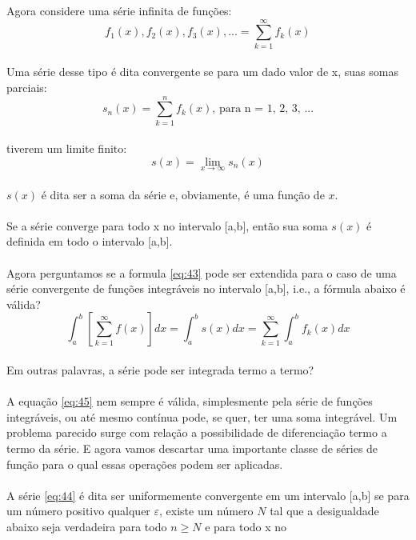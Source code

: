 Agora considere uma série infinita de funções:\\
\begin{equation}
    f_1(x), f_2(x), f_3(x), ... = \sum\limits_{k=1}^{\infty}f_k(x)
\label{eq:44}
\end{equation}
\\
Uma série desse tipo é dita convergente se para um dado valor de x,
suas somas parciais:\\
\begin{equation}
    s_n(x) = \sum\limits_{k=1}^{n}f_k(x)\text{, para n = 1, 2, 3, ...}
\end{equation}
\\
tiverem um limite finito:\\
\begin{equation}
    s(x) = \lim_{x\to\infty} s_n(x)
\end{equation}
\\
$s(x)$ é dita ser a soma da série e, obviamente, é uma função de $x$.\\
\\
Se a série converge para todo x no intervalo [a,b], então sua soma $s(x)$
é definida em todo o intervalo [a,b].\\
\\
Agora perguntamos se a formula \ref{eq:43} pode ser extendida para o caso de 
uma série convergente de funções integráveis no intervalo [a,b], i.e.,
a fórmula abaixo é válida?\\
\begin{equation}
    \int_{a}^{b}\left[\sum\limits_{k=1}^{\infty}f(x)\right]dx = \int_{a}^{b}s(x) dx = \sum\limits_{k=1}^{\infty}\int_{a}^{b}f_k(x) dx
\label{eq:45}
\end{equation}
\\
Em outras palavras, a série pode ser integrada termo a termo?\\
\\
A equação \ref{eq:45} nem sempre é válida, simplesmente pela série de funções integráveis,
ou até mesmo contínua pode, se quer, ter uma soma integrável. Um problema parecido 
surge com relação a possibilidade de diferenciação termo a termo da série.
E agora vamos descartar uma importante classe de séries de função para o qual 
essas operações podem ser aplicadas.\\
\\
A série \ref{eq:44} é dita ser uniformemente convergente em um intervalo [a,b] se
para um número positivo qualquer $\varepsilon$, existe um número $N$ tal que a
desigualdade abaixo seja verdadeira para todo $n \geq N$ e para todo x no 
